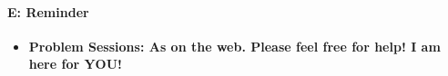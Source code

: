 \documentclass[12pt]{article}
\begin{document}

\paragraph{E: Reminder}
\begin{itemize}
\item{\bf Problem Sessions: As on the web.  Please feel free 
for help!  I am here for YOU!}
\end{itemize}
\end{document}
